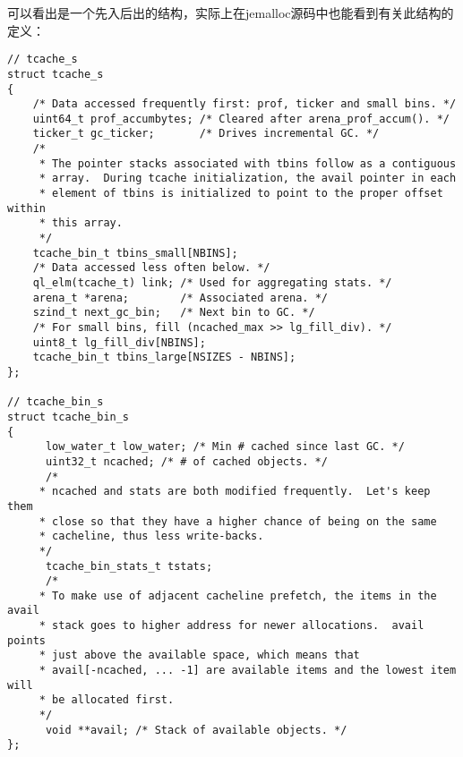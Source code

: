 可以看出是一个先入后出的结构，实际上在jemalloc源码中也能看到有关此结构的定义：
\begin{verbatim}
// tcache_s
struct tcache_s
{
    /* Data accessed frequently first: prof, ticker and small bins. */
    uint64_t prof_accumbytes; /* Cleared after arena_prof_accum(). */
    ticker_t gc_ticker;       /* Drives incremental GC. */
    /*
     * The pointer stacks associated with tbins follow as a contiguous
     * array.  During tcache initialization, the avail pointer in each
     * element of tbins is initialized to point to the proper offset within
     * this array.
     */
    tcache_bin_t tbins_small[NBINS];
    /* Data accessed less often below. */
    ql_elm(tcache_t) link; /* Used for aggregating stats. */
    arena_t *arena;        /* Associated arena. */
    szind_t next_gc_bin;   /* Next bin to GC. */
    /* For small bins, fill (ncached_max >> lg_fill_div). */
    uint8_t lg_fill_div[NBINS];
    tcache_bin_t tbins_large[NSIZES - NBINS];
};

// tcache_bin_s
struct tcache_bin_s
{
      low_water_t low_water; /* Min # cached since last GC. */
      uint32_t ncached; /* # of cached objects. */
      /*
     * ncached and stats are both modified frequently.  Let's keep them
     * close so that they have a higher chance of being on the same
     * cacheline, thus less write-backs.
     */
      tcache_bin_stats_t tstats;
      /*
     * To make use of adjacent cacheline prefetch, the items in the avail
     * stack goes to higher address for newer allocations.  avail points
     * just above the available space, which means that
     * avail[-ncached, ... -1] are available items and the lowest item will
     * be allocated first.
     */
      void **avail; /* Stack of available objects. */
};
\end{verbatim}

